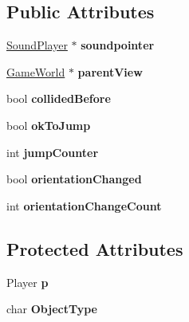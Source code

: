 \subsection*{Public Attributes}
\begin{DoxyCompactItemize}
\item 
\hyperlink{class_sound_player}{Sound\+Player} $\ast$ {\bfseries soundpointer}\hypertarget{class_world_object_aa42e809573507ad4b6a72b67521f004e}{}\label{class_world_object_aa42e809573507ad4b6a72b67521f004e}

\item 
\hyperlink{class_game_world}{Game\+World} $\ast$ {\bfseries parent\+View}\hypertarget{class_world_object_a0d420f146459b4776aab6c177847a717}{}\label{class_world_object_a0d420f146459b4776aab6c177847a717}

\item 
bool {\bfseries collided\+Before}\hypertarget{class_world_object_aa9eb87ca75a3c0147a20e214898306e2}{}\label{class_world_object_aa9eb87ca75a3c0147a20e214898306e2}

\item 
bool {\bfseries ok\+To\+Jump}\hypertarget{class_world_object_ae8ec648eb0fff181a1f99474863d2768}{}\label{class_world_object_ae8ec648eb0fff181a1f99474863d2768}

\item 
int {\bfseries jump\+Counter}\hypertarget{class_world_object_aaab8ba5520b5ea3d04b38cf86089f1c7}{}\label{class_world_object_aaab8ba5520b5ea3d04b38cf86089f1c7}

\item 
bool {\bfseries orientation\+Changed}\hypertarget{class_world_object_a79be554114fe33bdcf4ddaa2e9a970c5}{}\label{class_world_object_a79be554114fe33bdcf4ddaa2e9a970c5}

\item 
int {\bfseries orientation\+Change\+Count}\hypertarget{class_world_object_ab6317ef729bccfc2b06b10dc7a45a9e0}{}\label{class_world_object_ab6317ef729bccfc2b06b10dc7a45a9e0}

\end{DoxyCompactItemize}
\subsection*{Protected Attributes}
\begin{DoxyCompactItemize}
\item 
Player {\bfseries p}\hypertarget{class_world_object_ad976169e7d76aaee0a913852fe861787}{}\label{class_world_object_ad976169e7d76aaee0a913852fe861787}

\item 
char {\bfseries Object\+Type}\hypertarget{class_world_object_a06b54b3198229f49b5ba5dcccc7710eb}{}\label{class_world_object_a06b54b3198229f49b5ba5dcccc7710eb}

\end{DoxyCompactItemize}



